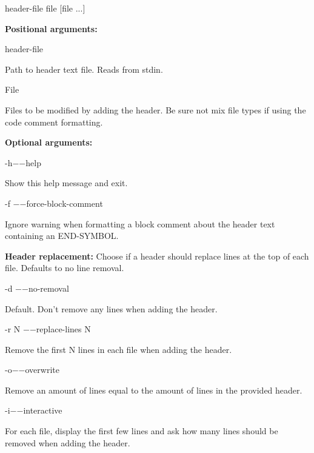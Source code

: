 \documentclass[11pt, oneside]{article}   	%
\begin{document}
\begin{addmargin}[5em]{2em}
{\selectfont 
 [-h] [-d $|$ -r N $|$ -o $|$ -i]    \newline
 [-f]  \newline
 header-file file [file ...]  
}
\end{addmargin}
\textbf{Positional arguments:}
\begin{addmargin}[5em]{2em}
{\selectfont header-file }   
	\begin{addmargin}[5em]{2em}
	Path to header text file. Reads from stdin.
	 \end{addmargin}
 \end{addmargin}
 \begin{addmargin}[5em]{2em}
{\selectfont File}	 
	\begin{addmargin}[5em]{2em}
	Files to be modified by adding the header.  Be sure not mix file types if using the code comment formatting. 
	\end{addmargin}
\end{addmargin}
\textbf{Optional arguments:}
\begin{addmargin}[5em]{2em}
-h\space\space\space\space\space\space	$-$$-$help            
        \begin{addmargin}[5em]{2em}
         Show this help message and exit.
         \end{addmargin}
-f \space\space\space\space\space\space 	$-$$-$force-block-comment
         \begin{addmargin}[5em]{2em}
	Ignore warning when formatting a block comment about the header text containing an END-SYMBOL.
	\end{addmargin}
\end{addmargin}
\textbf{Header replacement:}\newline
Choose if a header should replace lines at the top of each file. Defaults to no line removal.
\begin{addmargin}[5em]{2em}
 -d \space\space\space\space\space\space  $-$$-$no-removal     
	\begin{addmargin}[5em]{2em}
	Default. Don't remove any lines when adding the header.
	\end{addmargin}
 -r N \space\space\space $-$$-$replace-lines N
	\begin{addmargin}[5em]{2em}
	Remove the first N lines in each file when adding the header.
	\end{addmargin}
-o\space\space\space\space\space\space 	$-$$-$overwrite       
	\begin{addmargin}[5em]{2em}
	Remove an amount of lines equal to the amount of lines in the provided header.
	\end{addmargin}
-i\space\space\space\space\space\space 	$-$$-$interactive     
	\begin{addmargin}[5em]{2em}
	For each file, display the first few lines and ask how many lines should be removed when adding the header.
	\end{addmargin}
\end{addmargin}
\end{document}
